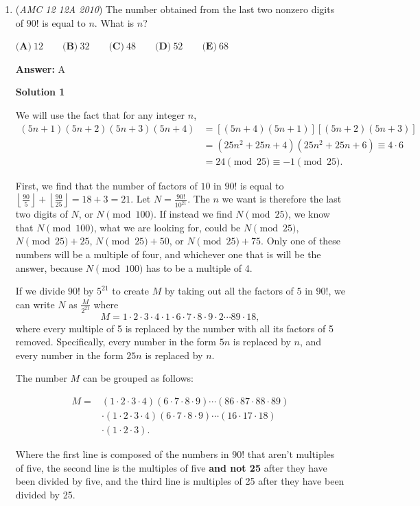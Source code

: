 \begin{enumerate}
 


	\item (\textit{AMC 12 12A 2010}) The number obtained from the last two nonzero digits of $90!$ is equal to $n$. What is $n$?


 $\textbf{(A)}\ 12 \qquad \textbf{(B)}\ 32 \qquad \textbf{(C)}\ 48 \qquad \textbf{(D)}\ 52 \qquad \textbf{(E)}\ 68$

 \textbf{Answer: }A



\textbf{Solution 1}

We will use the fact that for any integer $n$,
 \begin{align*}(5n+1)(5n+2)(5n+3)(5n+4)&=[(5n+4)(5n+1)][(5n+2)(5n+3)]\\ &=(25n^2+25n+4)(25n^2+25n+6)\equiv 4\cdot 6\\ &=24\pmod{25}\equiv -1\pmod{25}.\end{align*}


 First, we find that the number of factors of $10$ in $90!$ is equal to $\left\lfloor \frac{90}5\right\rfloor+\left\lfloor\frac{90}{25}\right\rfloor=18+3=21$. Let $N=\frac{90!}{10^{21}}$. The $n$ we want is therefore the last two digits of $N$, or $N\pmod{100}$. If instead we find $N\pmod{25}$, we know that $N\pmod{100}$, what we are looking for, could be $N\pmod{25}$, $N\pmod{25}+25$, $N\pmod{25}+50$, or $N\pmod{25}+75$. Only one of these numbers will be a multiple of four, and whichever one that is will be the answer, because $N\pmod{100}$ has to be a multiple of 4.

 If we divide $90!$ by $5^{21}$ to create $M$ by taking out all the factors of $5$ in $90!$, we can write $N$ as $\frac M{2^{21}}$ where
 \[M=1\cdot 2\cdot 3\cdot 4\cdot 1\cdot 6\cdot 7\cdot 8\cdot 9\cdot 2\cdots 89\cdot 18,\]where every multiple of 5 is replaced by the number with all its factors of 5 removed. Specifically, every number in the form $5n$ is replaced by $n$, and every number in the form $25n$ is replaced by $n$.

 The number $M$ can be grouped as follows:

 
 \begin{align*}M= &(1\cdot 2\cdot 3\cdot 4)(6\cdot 7\cdot 8\cdot 9)\cdots(86\cdot 87\cdot 88\cdot 89)\\ &\cdot (1\cdot 2\cdot 3\cdot 4)(6\cdot 7\cdot 8\cdot 9)\cdots (16\cdot 17\cdot 18) \\ &\cdot (1\cdot 2\cdot 3).\end{align*}


 Where the first line is composed of the numbers in $90!$ that aren't multiples of five, the second line is the multiples of five \textbf{and not 25} after they have been divided by five, and the third line is multiples of 25 after they have been divided by 25.


\end{enumerate}
